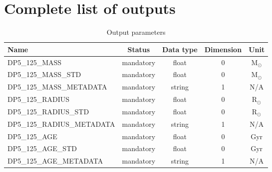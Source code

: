 \documentclass[a4paper, oneside, 11pt, article, english]{memoir}
\begin{document}
\section{Complete list of outputs}
\label{sec:output}

\iffalse
{
  \itshape
  A comprehensive list of outputs must be provided in the table. For each output,
  the following information is needed

  \begin{description}
    \firmlist
  \item[Name] the name must follow the nomenclature as defined by WP120 Data
    Products Definition Document [RD3].
  \item[Status] specify if this data is \emph{mandatory} or \emph{optional} to run the algorithm.
  \item[Data type] see \cref{sec:nomenclature} for the standard definitions
  \item[Dimension] specify the dimension of the data (e.g; the dimension of a scalar is 0, of an array 1, etc).
  \item[Unit] provide the unit of the data and the data-system of units (cgs or mks).
  \end{description}
}
\fi

\begin{table}[htbp]
  \centering
  \caption{Output parameters}
  \label{tab:output}
  \begin{tabular}{lcccc}
    \toprule
    Name & Status & Data type & Dimension & Unit \\
    \midrule
    DP5\_125\_MASS & mandatory & float & 0 & M$_\odot$ \\
    DP5\_125\_MASS\_STD & mandatory & float & 0 & M$_\odot$ \\
    DP5\_125\_MASS\_METADATA & mandatory & string & 1 & N/A \\
    DP5\_125\_RADIUS & mandatory & float & 0 & R$_\odot$ \\
    DP5\_125\_RADIUS\_STD & mandatory & float & 0 & R$_\odot$ \\
    DP5\_125\_RADIUS\_METADATA & mandatory & string & 1 & N/A \\
    DP5\_125\_AGE & mandatory & float & 0 & Gyr \\
    DP5\_125\_AGE\_STD & mandatory & float & 0 & Gyr \\
    DP5\_125\_AGE\_METADATA & mandatory & string & 1 & N/A \\
    \bottomrule
  \end{tabular}
\end{table}
\end{document}

